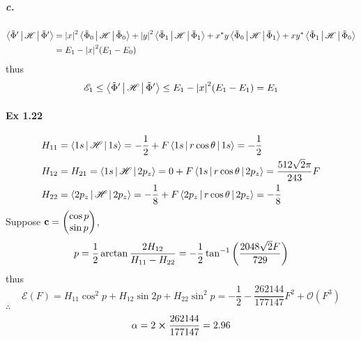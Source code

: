 \documentclass[a4paper]{article}
\newcommand{\ex}[1]{\paragraph{Ex #1}}
\newcommand{\subex}[1]{\subparagraph{#1}}
\newcommand{\tPhi}{\tilde{\Phi} }
\numberwithin{equation}{subsection}
\begin{document}
\subex{c.}
\begin{equation}\label{key}
\begin{aligned}
\Braket{\tPhi' | \mathscr{H} | \tPhi'} &= \abs{x}^2 \Braket{\tPhi_0 | \mathscr{H} | \tPhi_0} + \abs{y}^2 \Braket{\tPhi_1 | \mathscr{H} | \tPhi_1} + x^* y \Braket{\tPhi_0 | \mathscr{H} | \tPhi_1} + x y^* \Braket{\tPhi_1 | \mathscr{H} | \tPhi_0}\\
&= E_1 - \abs{x}^2(E_1 - E_0)
\end{aligned}
\end{equation}
thus
\begin{equation}\label{key}
\mathscr{E}_1 \leq \Braket{\tPhi' | \mathscr{H} | \tPhi'} \leq E_1 - \abs{x}^2(E_1-E_1) = E_1
\end{equation}

\ex{1.22}
\begin{equation}\label{key}
\begin{aligned}
H_{11} &= \Braket{1s | \mathscr{H} | 1s} = -\dfrac{1}{2} + F\Braket{1s| r\cos\theta | 1s} = -\dfrac{1}{2}\\
H_{12} &= H_{21} = \Braket{1s | \mathscr{H} | 2p_z} = 0 + F\Braket{1s| r\cos\theta | 2p_z} = \dfrac{512 \sqrt{2} \pi }{243}F\\
H_{22} &= \Braket{2p_z | \mathscr{H} | 2p_z} = -\dfrac{1}{8} + F\Braket{2p_z| r\cos\theta | 2p_z} = -\dfrac{1}{8}
\end{aligned}
\end{equation}
Suppose $ \vb{c} = \mqty(\cos p\\ \sin p) $,
\begin{equation}\label{key}
p = \dfrac{1}{2}\arctan\dfrac{2H_{12}}{H_{11} - H_{22}} = -\dfrac{1}{2} \tan ^{-1}\qty(\dfrac{2048 \sqrt{2} F}{729})
\end{equation}
thus
\begin{equation}\label{key}
\mathscr{E}(F) = H_{11}\cos^2 p + H_{12}\sin 2p + H_{22}\sin^2 p = -\dfrac{1}{2}-\dfrac{262144}{177147}F^2+\mathcal{O}(F^3)
\end{equation}
$ \therefore $
\begin{equation}\label{key}
\alpha = 2\cross\dfrac{262144}{177147} = 2.96
\end{equation}
\end{document}
